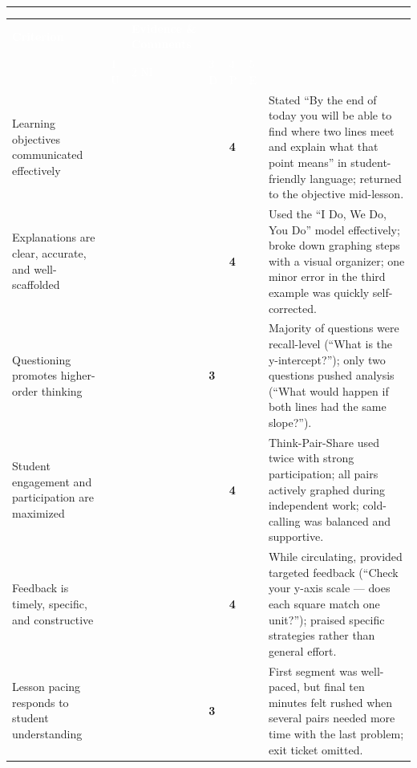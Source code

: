 \documentclass[11pt,a4paper]{article}
\newcommand{\sectionheader}[1]{%
  \vspace{14pt}
  \noindent{\Large\textcolor{primary}{\textbf{#1}}}\par
  \vspace{2pt}
  \noindent\textcolor{accent}{\rule{\textwidth}{1.2pt}}\par
  \vspace{8pt}
}
\begin{document}
\vspace{10pt}

\sectionheader{Domain III: Instructional Delivery}

\begin{tabularx}{\textwidth}{>{\raggedright\arraybackslash}p{4.0cm}*{5}{>{\centering\arraybackslash}p{1.05cm}}>{\raggedright\arraybackslash}X}
\toprule
\rowcolor{primary}
\textcolor{white}{\textbf{Criterion}} & \multicolumn{5}{c}{\textcolor{white}{\textbf{Rating}}} & \textcolor{white}{\textbf{Evidence \& Comments}} \\
& \textcolor{white}{\footnotesize 1 U} & \textcolor{white}{\footnotesize 2 NI} & \textcolor{white}{\footnotesize 3 D} & \textcolor{white}{\footnotesize 4 P} & \textcolor{white}{\footnotesize 5 E} & \\
\midrule
Learning objectives communicated effectively & & & & \cellcolor{ratingshade}\textbf{4} & & Stated \textquotedblleft{}By the end of today you will be able to find where two lines meet and explain what that point means\textquotedblright{} in student-friendly language; returned to the objective mid-lesson. \\
\midrule
Explanations are clear, accurate, and well-scaffolded & & & & \cellcolor{ratingshade}\textbf{4} & & Used the \textquotedblleft{}I Do, We Do, You Do\textquotedblright{} model effectively; broke down graphing steps with a visual organizer; one minor error in the third example was quickly self-corrected. \\
\midrule
Questioning promotes higher-order thinking & & & \cellcolor{ratingshade}\textbf{3} & & & Majority of questions were recall-level (\textquotedblleft{}What is the y-intercept?\textquotedblright{}); only two questions pushed analysis (\textquotedblleft{}What would happen if both lines had the same slope?\textquotedblright{}). \\
\midrule
Student engagement and participation are maximized & & & & \cellcolor{ratingshade}\textbf{4} & & Think-Pair-Share used twice with strong participation; all pairs actively graphed during independent work; cold-calling was balanced and supportive. \\
\midrule
Feedback is timely, specific, and constructive & & & & \cellcolor{ratingshade}\textbf{4} & & While circulating, provided targeted feedback (\textquotedblleft{}Check your y-axis scale --- does each square match one unit?\textquotedblright{}); praised specific strategies rather than general effort. \\
\midrule
Lesson pacing responds to student understanding & & & \cellcolor{ratingshade}\textbf{3} & & & First segment was well-paced, but final ten minutes felt rushed when several pairs needed more time with the last problem; exit ticket omitted. \\
\bottomrule
\end{tabularx}
\end{document}
